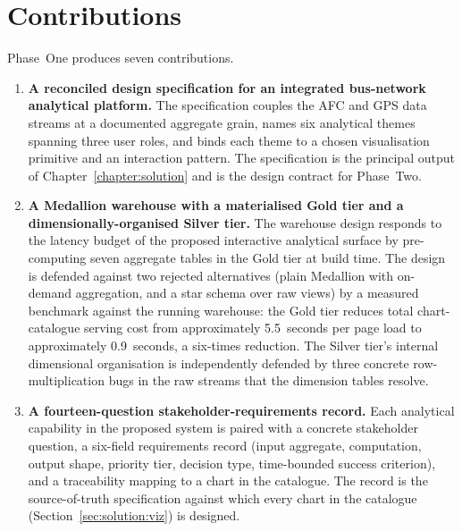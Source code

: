 \section{Contributions}
\label{sec:conclusion:contributions}

Phase~One produces seven contributions.

\begin{enumerate}
    \item \textbf{A reconciled design specification for an integrated
    bus-network analytical platform.} The specification couples the
    AFC and GPS data streams at a documented aggregate grain, names
    six analytical themes spanning three user roles, and binds each
    theme to a chosen visualisation primitive and an interaction
    pattern. The specification is the principal output of
    Chapter~\ref{chapter:solution} and is the design contract for
    Phase~Two.

    \item \textbf{A Medallion warehouse with a materialised Gold tier
    and a dimensionally-organised Silver tier.} The warehouse design
    responds to the latency budget of the proposed interactive
    analytical surface by pre-computing seven aggregate tables in the
    Gold tier at build time. The design is defended against two
    rejected alternatives (plain Medallion with on-demand
    aggregation, and a star schema over raw views) by a measured
    benchmark against the running warehouse: the Gold tier reduces
    total chart-catalogue serving cost from approximately
    5.5~seconds per page load to approximately 0.9~seconds, a
    six-times reduction. The Silver tier's internal dimensional
    organisation is independently defended by three concrete
    row-multiplication bugs in the raw streams that the dimension
    tables resolve.

    \item \textbf{A fourteen-question stakeholder-requirements
    record.} Each analytical capability in the proposed system is
    paired with a concrete stakeholder question, a six-field
    requirements record (input aggregate, computation, output shape,
    priority tier, decision type, time-bounded success criterion),
    and a traceability mapping to a chart in the catalogue. The
    record is the source-of-truth specification against which every
    chart in the catalogue (Section~\ref{sec:solution:viz}) is
    designed.


\end{enumerate}
